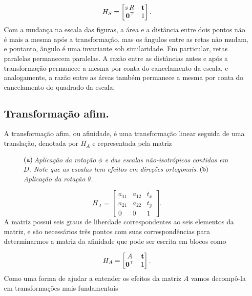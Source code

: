 \begin{equation*}
H_S=
\begin{bmatrix}
s\,R&{\bf t}\\
\,{\bf 0}^\top&1
\end{bmatrix}.
\end{equation*}
Com a mudança na escala das figuras, a área e a distância entre dois pontos não é mais a mesma após a transformação, mas os ângulos entre as retas não mudam, e pontanto, ângulo é uma invariante sob similaridade. Em particular, retas paralelas permanecem paralelas. A razão entre as distâncias antes e após a transformação permanece a mesma por conta do cancelamento da escala, e analogamente, a razão entre as áreas também permanece a mesma por conta do cancelamento do quadrado da escala.

\subsection*{Transformação afim.}
A transformação afim, ou afinidade, é uma transformação linear seguida de uma translação, denotada por $H_A$ e representada pela matriz

\begin{figure}[!htb]
\centering
{}
\quad
{}
\caption{$({\tt a})\,$\textit{Aplicação da rotação $\phi$ e das escalas não-isotrópicas contidas em $D$. Note que as escalas tem efeitos em direções ortogonais.}$\,({\tt b})\,$\textit{Aplicação da rotação $\theta$.}}
\label{fig.angulos-afinidades}
\end{figure}

\begin{equation*}
H_A=
\begin{bmatrix}
a_{11}&a_{12}&t_x\\
a_{21}&a_{22}&t_y\\
0&0&1
\end{bmatrix}.
\end{equation*}
A matriz possui seis graus de liberdade correspondentes ao seis elementos da matriz, e são necessários três pontos com suas correspondências para determinarmos a matriz da afinidade que pode ser escrita em blocos como

\begin{equation*}
H_A=
\begin{bmatrix}
A&{\bf t}\\
{\bf 0}^\top&1
\end{bmatrix}.
\end{equation*}
Como uma forma de ajudar a entender os efeitos da matriz $A$ vamos decompô-la em transformações mais fundamentais

